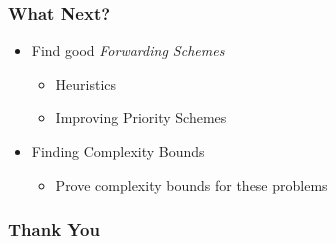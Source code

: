 \documentclass{beamer}
\begin{document}
\begin{frame}
\frametitle{What Next?}
	\begin{itemize}
	\item Find good \textit{Forwarding Schemes}
		\begin{itemize}
		\item Heuristics
		\item Improving Priority Schemes
		\end{itemize}
	\item Finding Complexity Bounds
		\begin{itemize}
		\item Prove complexity bounds for these problems
		\end{itemize}
	\end{itemize}
\end{frame}

\begin{frame}
\frametitle{Thank You}
\end{frame}
\end{document}
